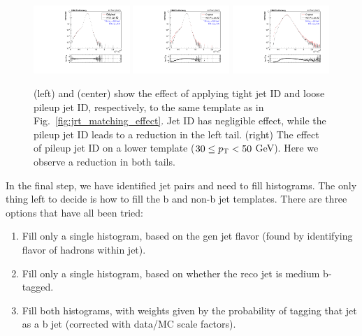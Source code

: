 \begin{figure}[htbp]
  \begin{center}
    \includegraphics[width=0.325\textwidth]{figs/jetmet/compare_jetID.pdf}
    \includegraphics[width=0.325\textwidth]{figs/jetmet/compare_puJetID_highPt.pdf}
    \includegraphics[width=0.325\textwidth]{figs/jetmet/compare_puJetID_lowPt.pdf}
    \caption{(left) and (center) show the effect of applying tight jet ID and loose pileup jet ID, respectively,
    to the same template as in Fig.~\ref{fig:jrt_matching_effect}. Jet ID has negligible effect,
    while the pileup jet ID leads to a reduction in the left tail.
    (right) The effect of pileup jet ID on a lower \pt template ($30\leq p_{\mathrm{T}}<50$ GeV). Here we observe
    a reduction in both tails.
    }
    \label{fig:jrt_jetid}
  \end{center}
\end{figure}

In the final step, we have identified jet pairs and need to fill histograms. The only thing left to decide
is how to fill the b and non-b jet templates. There are three options that have all been tried:
\begin{enumerate}
  \item Fill only a single histogram, based on the gen jet flavor (found by identifying flavor of hadrons within jet).
  \item Fill only a single histogram, based on whether the reco jet is medium b-tagged.
  \item Fill both histograms, with weights given by the probability of tagging that jet as a b jet (corrected with data/MC scale factors).
\end{enumerate}

